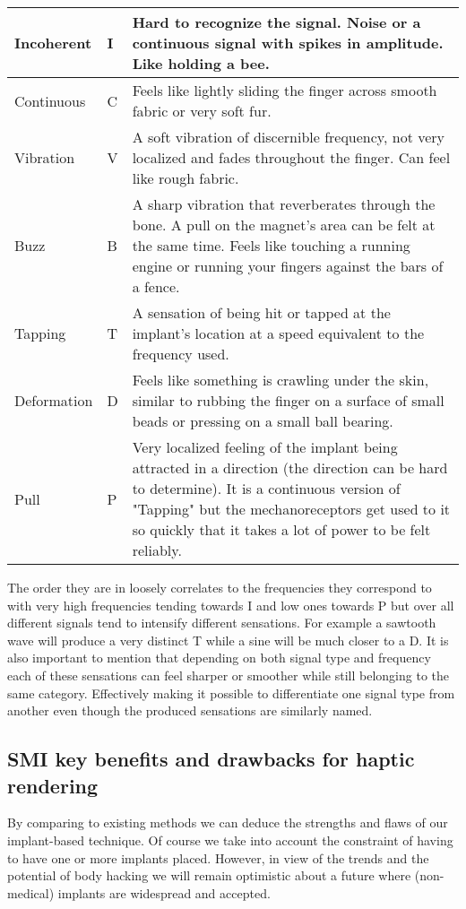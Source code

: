 \documentclass[10pt,journal,compsoc]{IEEEtran}
\begin{document}
	\begin{center}
		\begin{tabular}{ | m{5.5em} | m{0.5em}| m{17em} | } 
			\hline
			Incoherent & I & Hard to recognize the signal. Noise or a continuous signal with spikes in amplitude. Like holding a bee. \\
			\hline 
			Continuous & C & Feels like lightly sliding the finger across smooth fabric or very soft fur. \\ 
			\hline
			Vibration & V & A soft vibration of discernible frequency, not very localized and fades throughout the finger. Can feel like rough fabric. \\ 
			\hline
			Buzz & B & A sharp vibration that reverberates through the bone. A pull on the magnet's area can be felt at the same time. Feels like touching a running engine or running your fingers against the bars of a fence. \\ 
			\hline
			Tapping & T & A sensation of being hit or tapped at the implant's location at a speed equivalent to the frequency used. \\ 
			\hline
			Deformation & D & Feels like something is crawling under the skin, similar to rubbing the finger on a surface of small beads 
			or pressing on a small ball bearing. \\ 
			\hline
			Pull & P & Very localized feeling of the implant being attracted in a direction (the direction can be hard to determine). It is a continuous version of "Tapping" but the mechanoreceptors get used to it so quickly that it takes a lot of power to be felt reliably. \\ 
			\hline
		\end{tabular}
	\end{center}
	
	The order they are in loosely correlates to the frequencies they correspond to with very high frequencies tending towards I and low ones towards P but over all different signals tend to intensify different sensations.
	For example a sawtooth wave will produce a very distinct T while a sine will be much closer to a D.
	It is also important to mention that depending on both signal type and frequency each of these sensations can feel sharper or smoother while still belonging to the same category. Effectively making it possible to differentiate one signal type from another even though the produced sensations are similarly named. 

	\subsection{SMI key benefits and drawbacks for haptic rendering}
	By comparing to existing methods we can deduce the strengths and flaws of our implant-based technique. Of course we take into account the constraint of having to have one or more implants placed. However, in view of the trends \cite{duarte2014ne} and the potential of body hacking we will remain optimistic about a future where (non-medical) implants are widespread and accepted.
	
\end{document}
